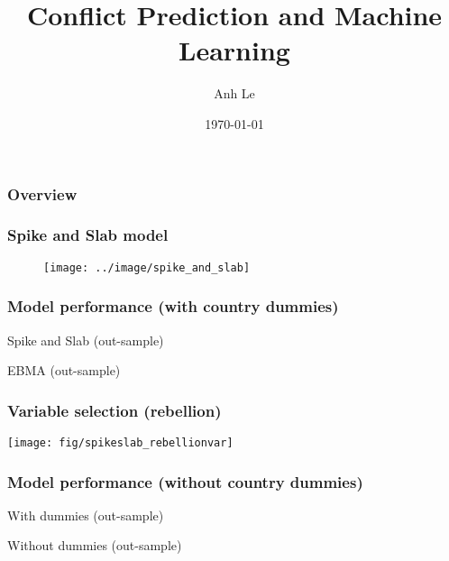 \documentclass{beamer}
\title[Conflict Prediction]{Conflict Prediction and Machine Learning} %
\author{Anh Le} %
\institute[Duke] %
{
Duke University \\ %
\medskip
\textit{anh.le@duke.edu} %
}
\date{\today} %
\begin{document}
\begin{frame}
\titlepage %
\end{frame}

\begin{frame}
\frametitle{Overview} %
\tableofcontents %
\end{frame}


\begin{frame}
\frametitle{Spike and Slab model}

\begin{figure}
\texttt{[image: ../image/spike\_and\_slab]}
\end{figure}
\end{frame}




\begin{frame}
\frametitle{Model performance (with country dummies)}
\begin{table}[H]
\centering
	
	\caption{Spike and Slab (out-sample)}
\end{table}
\begin{table}
	
	\caption{EBMA (out-sample)}
\end{table}
\end{frame}

\begin{frame}
\frametitle{Variable selection (rebellion)}
\texttt{[image: fig/spikeslab\_rebellionvar]}
\end{frame}

\begin{frame}
\frametitle{Model performance (without country dummies)}

\begin{table}[H]
	
	\caption{With dummies (out-sample)}
\end{table}

\begin{table}
	
	\caption{Without dummies (out-sample)}
\end{table}
\end{frame}
\end{document}
